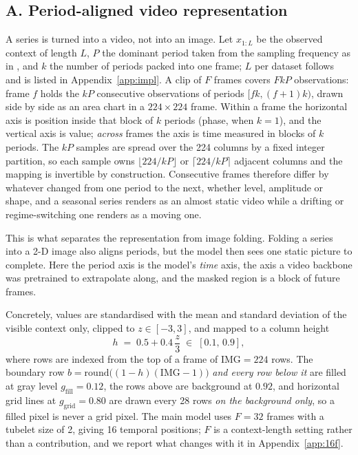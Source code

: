\subsection{A. Period-aligned video representation}
\label{sec:render}

A series is turned into a video, not into an image. Let $x_{1:L}$ be the observed context of length $L$, $P$ the dominant period taken from the sampling
frequency as in \citet{visionts}, and $k$ the number of periods packed into one frame; $L$ per
dataset follows \citet{visionts} and is listed in Appendix~\ref{app:impl}. A clip of $F$ frames covers $FkP$ observations: frame $f$ holds the $kP$ consecutive observations of
periods $[fk,(f+1)k)$, drawn side by side as an area chart in a $224\times224$ frame. Within a frame
the horizontal axis is position inside that block of $k$ periods (phase, when $k=1$), and the
vertical axis is value; \emph{across} frames the axis is time measured in blocks of $k$ periods. The
$kP$ samples are spread over the 224 columns by a fixed integer partition, so each sample owns
$\lfloor 224/kP \rfloor$ or $\lceil 224/kP \rceil$ adjacent columns and the mapping is invertible by
construction. Consecutive frames therefore differ by whatever changed from one period to the
next, whether level, amplitude or shape, and a seasonal series renders as an almost static video while a
drifting or regime-switching one renders as a moving one.

This is what separates the representation from image folding. Folding a series into a 2-D image also
aligns periods, but the model then sees one static picture to complete. Here the period axis is the
model's \emph{time} axis, the axis a video backbone was pretrained to extrapolate along, and
the masked region is a block of future frames.

Concretely, values are standardised with the mean and standard deviation of the visible context
only, clipped to $z\in[-3,3]$, and mapped to a column height
\begin{equation}
h \;=\; 0.5 + 0.4\,\frac{z}{3}\;\in\;[0.1,\,0.9],
\label{eq:height}
\end{equation}
where rows are indexed from the top of a frame of $\mathrm{IMG}=224$ rows. The boundary row
$b=\mathrm{round}\big((1-h)(\mathrm{IMG}-1)\big)$ \emph{and every row below it} are filled at gray
level $g_{\mathrm{fill}}=0.12$, the rows above are background at $0.92$, and horizontal grid lines at
$g_{\mathrm{grid}}=0.80$ are drawn every 28 rows \emph{on the background only}, so a filled pixel is
never a grid pixel. The
main model uses $F=32$ frames with a tubelet size of 2, giving 16 temporal positions; $F$ is a
context-length setting rather than a contribution, and we report what changes with it in
Appendix~\ref{app:16f}.

